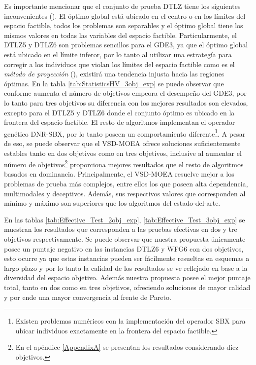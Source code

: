 Es importante mencionar que el conjunto de prueba DTLZ tiene los siguientes inconvenientes (\cite{zhang2008multiobjective}).
%
El óptimo global está ubicado en el centro o en los límites del espacio factible, todos los problemas son separables y el óptimo global tiene los mismos valores en todas las variables del espacio factible.
%
Particularmente, el DTLZ5 y DTLZ6 son problemas sencillos para el GDE3, ya que el óptimo global está ubicado en el límite inferor, por lo tanto al utilizar una estrategía para corregir a los individuos que violan los límites del espacio factible como es el \textit{método de proyección} (\cite{kreischerevaluation}), existirá una tendencia injusta hacia las regiones óptimas.
%
En la tabla \ref{tab:StatisticsHV_3obj_exp} se puede observar que conforme aumenta el número de objetivos empeora el desempeño del GDE3, por lo tanto para tres objetivos su diferencia con los mejores resultados son elevados, excepto para el DTLZ5 y DTLZ6 donde el conjunto óptimo es ubicado en la frontera del espacio factible.
%
El resto de algoritmos implementan el operador genético DNR-SBX, por lo tanto poseen un comportamiento diferente\footnote{Existen problemas numéricos con la implementación del operador SBX para ubicar individuos exactamente en la frontera del espacio factible.}.
A pesar de eso, se puede observar que el VSD-MOEA ofrece soluciones suficientemente estables tanto en dos objetivos como en tres objetivos, inclusive al aumentar el número de objetivos\footnote{En el apéndice \ref{AppendixA} se presentan los resultados considerando diez objetivos.} proporciona mejores resultados que el resto de algoritmos basados en dominancia.
%
Principalmente, el VSD-MOEA resuelve mejor a los problemas de prueba más complejos, entre ellos los que poseen alta dependencia, multimodales y deceptivos.
%
Además, sus respectivos valores que corresponden al mínimo y máximo son superiores que los algoritmos del estado-del-arte.
%

En las tablas \ref{tab:Effective_Test_2obj_exp}, \ref{tab:Effective_Test_3obj_exp} se muestran los resultados que corresponden a las pruebas efectivas en dos y tre objetivos respectivamente.
%
Se puede observar que nuestra propuesta únicamente posee un puntaje negativo en las instancias DTLZ6 y WFG6 con dos objetivos, esto ocurre ya que estas instancias pueden ser fácilmente resueltas en esquemas a largo plazo y por lo tanto la calidad de los resultados se ve reflejado en base a la diversidad del espacio objetivo.
%
Además nuestra propuesta posee el mejor puntaje total, tanto en dos como en tres objetivos, ofreciendo soluciones de mayor calidad y por ende una mayor convergencia al frente de Pareto.

